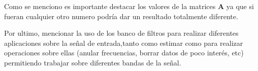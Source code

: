 	Como se menciono es importante destacar los valores de la matrices \textbf{A} ya que si fueran cualquier otro numero podría dar un resultado totalmente diferente. 
	
	Por ultimo, mencionar la uso de los banco de filtros para realizar diferentes aplicaciones sobre la señal de entrada,tanto como estimar como para realizar operaciones sobre ellas (anular frecuencias, borrar datos de poco interés, etc) permitiendo trabajar sobre diferentes bandas de la señal.
